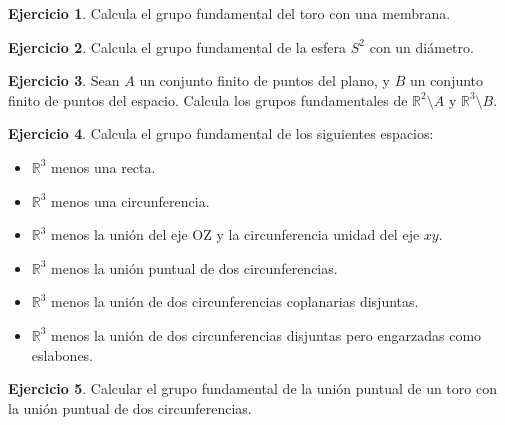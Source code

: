\documentclass{article}
\theoremstyle{plain}
\theoremstyle{definition}
\newtheorem{exercise}{Ejercicio}
\begin{document}
\begin{exercise}

Calcula el grupo fundamental del toro con una membrana.

\end{exercise}

\begin{exercise}

Calcula el grupo fundamental de la esfera $S^2$ con un di\'ametro.

\end{exercise}

\begin{exercise}

Sean $A$ un conjunto finito de puntos del plano, y $B$ un conjunto finito de puntos del espacio. Calcula los grupos fundamentales de $\mathbb{R}^2\setminus A$ y $\mathbb{R}^3\setminus B$.

\end{exercise}

\begin{exercise}

Calcula el grupo fundamental de los siguientes espacios:

\begin{itemize}

\item $\mathbb{R}^3$ menos una recta.

\item $\mathbb{R}^3$ menos una circunferencia.

\item $\mathbb{R}^3$ menos la uni\'on del eje OZ y la circunferencia unidad del eje $xy$.

\item $\mathbb{R}^3$ menos la uni\'on puntual de dos circunferencias.

\item $\mathbb{R}^3$ menos la uni\'on de dos circunferencias coplanarias disjuntas.

\item $\mathbb{R}^3$ menos la uni\'on de dos circunferencias disjuntas pero engarzadas como eslabones.



\end{itemize}

\end{exercise}



\begin{exercise}

Calcular el grupo fundamental de la uni\'on puntual de un toro con la uni\'on puntual de dos circunferencias.



\end{exercise}
\end{document}
